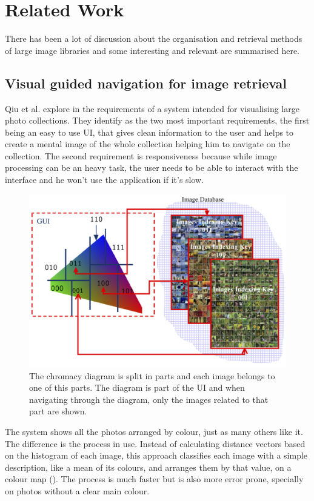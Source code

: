 \chapter{Related Work}
\label{chapter:related-work}


There has been a lot of discussion about the organisation and retrieval methods of large image libraries and some interesting and relevant are summarised here.

\section{Visual guided navigation for image retrieval} %
\label{sub:Qiu}

Qiu et al. explore in \cite{Qiu:2007p1207} the requirements of a system intended for visualising large photo collections. They identify as the two most important requirements, the first being an easy to use \ac{UI}, that gives clean information to the user and helps to create a mental image of the whole collection helping him to navigate on the collection. The second requirement is responsiveness because while image processing can be an heavy task, the user needs to be able to interact with the interface and he won't use the application if it's slow. 

\begin{figure}[ht]
	\centering
		\includegraphics[width=0.6\columnwidth]{imgs-RelatedWork/Qiu-2007p1207.png}
	\caption{The chromacy diagram is split in parts and each image belongs to one of this parts. The diagram is part of the \ac{UI} and  when navigating through the diagram, only the images related to that part are shown.}
	\label{fig:qiu1}
\end{figure}

The system shows all the photos arranged by colour, just as many others like it. The difference is the process in use. Instead of calculating distance vectors based on the histogram of each image, this approach classifies each image with a simple description, like a mean of its colours, and arranges them by that value, on a colour map (). The process is much faster but is also more error prone, specially on photos without a clear main colour.

